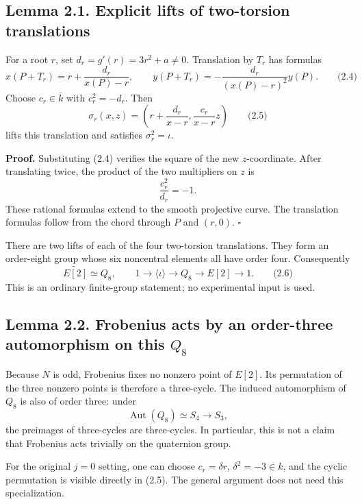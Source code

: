 \documentclass[
  11pt,
  a4paper,
]{article}
\begin{document}
\subsection{Lemma 2.1. Explicit lifts of two-torsion
translations}\label{lemma-2.1.-explicit-lifts-of-two-torsion-translations}

For a root \(r\), set \(d_r=g'(r)=3r^2+a\ne0\). Translation by \(T_r\)
has formulas \[
x(P+T_r)=r+\frac{d_r}{x(P)-r},
\qquad
y(P+T_r)=-\frac{d_r}{(x(P)-r)^2}y(P).
\qquad \text{(2.4)}
\] Choose \(c_r\in\bar k\) with \(c_r^2=-d_r\). Then \[
\sigma_r(x,z)=\left(r+\frac{d_r}{x-r},\frac{c_r}{x-r}z\right)
\qquad \text{(2.5)}
\] lifts this translation and satisfies \(\sigma_r^2=\iota\).

\textbf{Proof.} Substituting (2.4) verifies the square of the new
\(z\)-coordinate. After translating twice, the product of the two
multipliers on \(z\) is \[
\frac{c_r^2}{d_r}=-1.
\] These rational formulas extend to the smooth projective curve. The
translation formulas follow from the chord through \(P\) and \((r,0)\).
\(\square\)

There are two lifts of each of the four two-torsion translations. They
form an order-eight group whose six noncentral elements all have order
four. Consequently \[
\widetilde{E[2]}\simeq Q_8,
\qquad
1\to\langle\iota\rangle\to Q_8\to E[2]\to1.
\qquad \text{(2.6)}
\] This is an ordinary finite-group statement; no experimental input is
used.

\subsection{\texorpdfstring{Lemma 2.2. Frobenius acts by an order-three
automorphism on this
\(Q_8\)}{Lemma 2.2. Frobenius acts by an order-three automorphism on this Q\_8}}\label{lemma-2.2.-frobenius-acts-by-an-order-three-automorphism-on-this-q_8}

Because \(N\) is odd, Frobenius fixes no nonzero point of \(E[2]\). Its
permutation of the three nonzero points is therefore a three-cycle. The
induced automorphism of \(Q_8\) is also of order three: under \[
\operatorname{Aut}(Q_8)\simeq S_4\longrightarrow S_3,
\] the preimages of three-cycles are three-cycles. In particular, this
is not a claim that Frobenius acts trivially on the quaternion group.

For the original \(j=0\) setting, one can choose \(c_r=\delta r\),
\(\delta^2=-3\in k\), and the cyclic permutation is visible directly in
(2.5). The general argument does not need this specialization.
\end{document}
